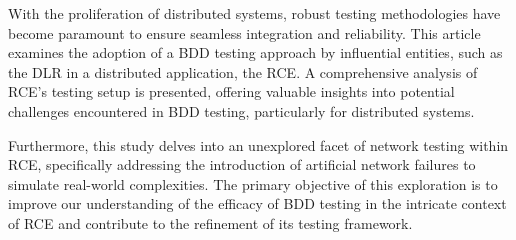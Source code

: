 With the proliferation of distributed systems, robust testing methodologies have become paramount to ensure seamless integration and reliability. This article examines the adoption of a \ac{BDD} testing approach by influential entities, such as the \ac{DLR} in a distributed application, the \ac{RCE}. A comprehensive analysis of \ac{RCE}'s testing setup is presented, offering valuable insights into potential challenges encountered in \ac{BDD} testing, particularly for distributed systems.

Furthermore, this study delves into an unexplored facet of network testing within \ac{RCE}, specifically addressing the introduction of artificial network failures to simulate real-world complexities. The primary objective of this exploration is to improve our understanding of the efficacy of \ac{BDD} testing in the intricate context of \ac{RCE} and contribute to the refinement of its testing framework.